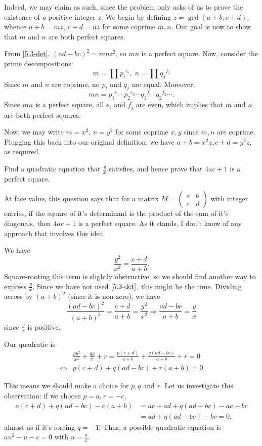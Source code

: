 \documentclass[../main.tex]{subfiles}
\begin{document}
Indeed, we may claim as such, since the problem only asks of us to prove the existence of \textit{a} positive integer $z$. We begin by defining $z=\gcd(a+b, c+d)$, whence $a+b=mz$, $c+d=nz$ for some coprime $m, n$. Our goal is now to show that $m$ and $n$ are both perfect squares.

From \eqref{5.3-det}, $(ad-bc)^2=mnz^2$, so $mn$ is a perfect square. Now, consider the prime decompositions:
    $$m = \prod {p_i}^{e_i}, \;n = \prod {q_j}^{f_j}$$
Since $m$ and $n$ are coprime, no $p_i$ and $q_j$ are equal.
Moreover,
$$mn = {p_1}^{e_1}\cdot{p_2}^{e_2}\cdots{q_1}^{f_1}\cdot{q_2}^{f_2}\cdots.$$
Since $mn$ is a perfect square, all $e_i$ and $f_j$ are even, which implies that $m$ and $n$ are both perfect squares.

Now, we may write $m=x^2$, $n=y^2$ for some coprime $x,y$ since $m, n$ are coprime. Plugging this back into our original definition, we have $a+b=x^2z, c+d=y^2z$, as required.

\begin{example}[cont.]
Find a quadratic equation that $\frac{y}{x}$ satisfies, and hence prove that $4ac+1$ is a perfect square.
\end{example}
\begin{remark}
At face value, this question says that for a matrix $M=\begin{pmatrix} a&b\\c&d
\end{pmatrix}$ with integer entries, if the square of it's determinant is the product of the sum of it's diagonals, then $4ac+1$ is a perfect square. As it stands, I don't know of any approach that involves this idea.
\end{remark}
We have
$$\frac{y^2}{x^2}=\frac{c+d}{a+b}.$$
Square-rooting this term is slightly obstructive, so we should find another way to express $\frac{y}{x}$. Since we have not used $\eqref{5.3-det}$, this might be the time. Dividing across by $(a+b)^2$ (since it is non-zero), we have
$$\frac{(ad-bc)^2}{(a+b)^2}=\frac{c+d}{a+b}=\frac{y^2}{x^2} \Longrightarrow \frac{ad-bc}{a+b}=\frac{y}{x}$$
since $\frac{y}{x}$ is positive.

Our quadratic is
\begin{align*}
   &\frac{py^2}{x^2}+\frac{qy}{x}+r=\frac{p(c+d)}{a+b}+\frac{q(ad-bc)}{a+b}+r=0 \\
   \Longleftrightarrow &p(c+d)+q(ad-bc)+r(a+b)=0
\end{align*}

This means we should make a choice for $p, q$ and $r$. Let us investigate this observation: if we choose $p=a, r=-c$,
\begin{align*}
    a(c+d)+q(ad-bc)-c(a+b)&=ac+ad+q(ad-bc)-ac-bc\\
    &=ad+q(ad-bc)-bc=0,
\end{align*}
almost as if it's forcing $q=-1$!
Thus, a possible quadratic equation is $au^2-u-c=0$ with $u=\frac{y}{x}$.
\end{document}
